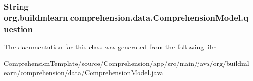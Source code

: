 \subsubsection[{\texorpdfstring{question}{question}}]{\setlength{\rightskip}{0pt plus 5cm}String org.\+buildmlearn.\+comprehension.\+data.\+Comprehension\+Model.\+question\hspace{0.3cm}{\ttfamily [private]}}\hypertarget{classorg_1_1buildmlearn_1_1comprehension_1_1data_1_1ComprehensionModel_a1ee55ec99912483b4905b501a1660938}{}\label{classorg_1_1buildmlearn_1_1comprehension_1_1data_1_1ComprehensionModel_a1ee55ec99912483b4905b501a1660938}


The documentation for this class was generated from the following file\+:\begin{DoxyCompactItemize}
\item 
Comprehension\+Template/source/\+Comprehension/app/src/main/java/org/buildmlearn/comprehension/data/\hyperlink{ComprehensionModel_8java}{Comprehension\+Model.\+java}\end{DoxyCompactItemize}
